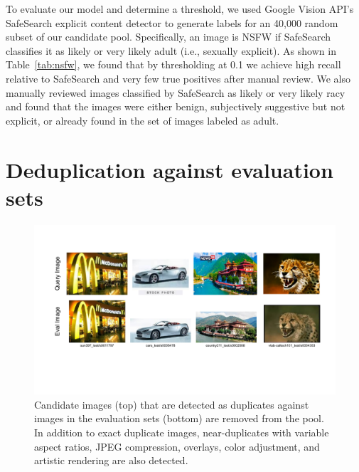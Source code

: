 To evaluate our model and determine a threshold, we used Google Vision API's SafeSearch explicit content detector to generate labels for an 40,000 random subset of our candidate pool. Specifically, an image is NSFW if SafeSearch classifies it as likely or very likely adult (i.e., sexually explicit). As shown in Table~\ref{tab:nsfw}, we found that by thresholding at 0.1 we achieve high recall relative to SafeSearch and very few true positives after manual review. We also manually reviewed images classified by SafeSearch as likely or very likely racy and found that the images were either benign, subjectively suggestive but not explicit, or already found in the set of images labeled as adult.

\section{Deduplication against evaluation sets}
\label{app:dedup}

\begin{figure}
    \centering
    \includegraphics[width=\textwidth]{figures/dedups.pdf}
    \caption{ Candidate images (top) that are detected as duplicates against images in the evaluation sets (bottom) are removed from the pool. In addition to exact duplicate images, near-duplicates with variable aspect ratios, JPEG compression, overlays, color adjustment, and artistic rendering are also detected. }
    \label{fig:dedups}
\end{figure}

